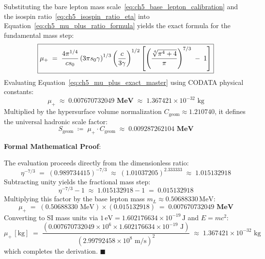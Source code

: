 \documentclass[
    12pt,
    a4paper,
    headings=normal,
    twoside=false,
    open=any,
    parskip=half
]{scrbook}
\let\hbar\relax
\newenvironment{myproof}[1][]{%
  \par\vspace{6pt}\noindent\textbf{\sffamily\color{maincolor}Formal Mathematical Proof\ifstrempty{#1}{}{ (#1)}}:\par\nopagebreak
}{%
  \penalty50\hfill\ensuremath{\blacksquare}\par\vspace{6pt}
}
\begin{document}
\begin{phystheorem}\label{thm:ch5_mu_plus_exact_master}
Substituting the bare lepton mass scale~\eqref{eq:ch5_base_lepton_calibration} and the isospin ratio~\eqref{eq:ch5_isospin_ratio_eta} into Equation~\eqref{eq:ch5_mu_plus_ratio_formula} yields the exact formula for the fundamental mass step:
\begin{equation}
\boxed{\mu_+ \;=\; \frac{4\pi^{1/4}}{c s_0} \left( 3\pi s_0 \gamma \hbar \right)^{1/3} \left( \frac{c\hbar}{3\gamma} \right)^{1/2} \left[ \left( \frac{\sqrt[4]{\pi^4 + 4}}{\pi} \right)^{7/3} \;-\; 1 \right]}
\label{eq:ch5_mu_plus_exact_master}
\end{equation}
Evaluating Equation~\eqref{eq:ch5_mu_plus_exact_master} using CODATA physical constants:
\begin{equation}
\boxed{\mu_+ \;\approx\; \mathbf{0.007670732049 \text{ MeV}} \;\approx\; 1.367421 \times 10^{-32} \text{ kg}}
\label{eq:ch5_mu_plus_numerical}
\end{equation}
Multiplied by the hypersurface volume normalization $C_{\text{geom}} \approx 1.210740$, it defines the universal hadronic scale factor:
\begin{equation}
S_{\text{geom}} \;\coloneqq\; \mu_+ \cdot C_{\text{geom}} \;\approx\; \mathbf{0.009287262104 \text{ MeV}}
\label{eq:ch5_scale_geom_numerical}
\end{equation}
\end{phystheorem}

\begin{myproof}
The evaluation proceeds directly from the dimensionless ratio:
\begin{equation*}
\eta^{-7/3} \;=\; (0.989734415)^{-7/3} \;\approx\; (1.01037205)^{2.333333} \;\approx\; 1.015132918
\end{equation*}
Subtracting unity yields the fractional mass step:
\begin{equation*}
\eta^{-7/3} - 1 \;\approx\; 1.015132918 - 1 \;=\; 0.015132918
\end{equation*}
Multiplying this factor by the base lepton mass $m_L \approx 0.50688330\,\text{MeV}$:
\begin{equation*}
\mu_+ \;=\; (0.50688330 \text{ MeV}) \times (0.015132918) \;=\; \mathbf{0.007670732049 \text{ MeV}}
\end{equation*}
Converting to SI mass units via $1\,\text{eV} = 1.602176634 \times 10^{-19}\,\text{J}$ and $E = mc^2$:
\begin{equation*}
\mu_+ \, [\text{kg}] \;=\; \frac{(0.007670732049 \times 10^6 \times 1.602176634 \times 10^{-19} \text{ J})}{(2.99792458 \times 10^8 \text{ m/s})^2} \;\approx\; 1.367421 \times 10^{-32} \text{ kg}
\end{equation*}
which completes the derivation.
\end{myproof}
\end{document}
